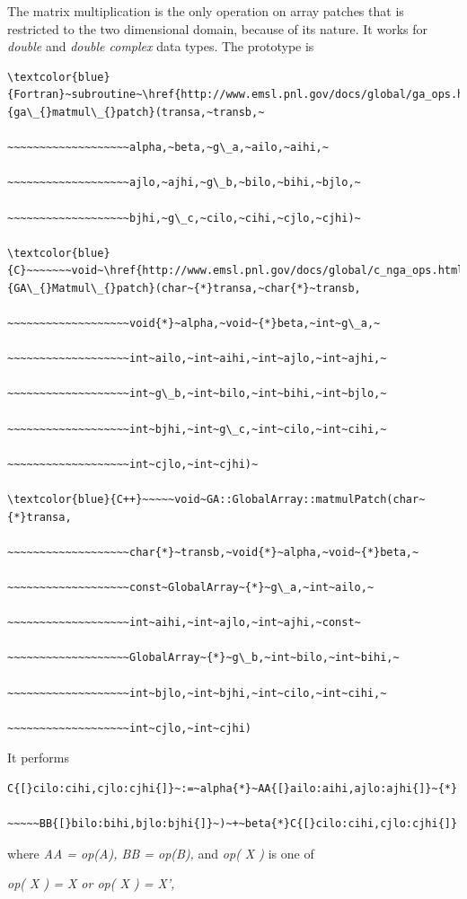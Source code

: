 The matrix multiplication is the only operation on array patches that
is restricted to the two dimensional domain, because of its nature.
It works for\emph{ double} and \emph{double complex} data types. The
prototype is
\begin{verbatim}
\textcolor{blue}{Fortran}~subroutine~\href{http://www.emsl.pnl.gov/docs/global/ga_ops.html\#ga_matmul_patch}{ga\_{}matmul\_{}patch}(transa,~transb,~

~~~~~~~~~~~~~~~~~~~alpha,~beta,~g\_a,~ailo,~aihi,~

~~~~~~~~~~~~~~~~~~~ajlo,~ajhi,~g\_b,~bilo,~bihi,~bjlo,~

~~~~~~~~~~~~~~~~~~~bjhi,~g\_c,~cilo,~cihi,~cjlo,~cjhi)~

\textcolor{blue}{C}~~~~~~~void~\href{http://www.emsl.pnl.gov/docs/global/c_nga_ops.html\#ga_matmul_patch}{GA\_{}Matmul\_{}patch}(char~{*}transa,~char{*}~transb,

~~~~~~~~~~~~~~~~~~~void{*}~alpha,~void~{*}beta,~int~g\_a,~

~~~~~~~~~~~~~~~~~~~int~ailo,~int~aihi,~int~ajlo,~int~ajhi,~

~~~~~~~~~~~~~~~~~~~int~g\_b,~int~bilo,~int~bihi,~int~bjlo,~

~~~~~~~~~~~~~~~~~~~int~bjhi,~int~g\_c,~int~cilo,~int~cihi,~

~~~~~~~~~~~~~~~~~~~int~cjlo,~int~cjhi)~

\textcolor{blue}{C++}~~~~~void~GA::GlobalArray::matmulPatch(char~{*}transa,

~~~~~~~~~~~~~~~~~~~char{*}~transb,~void{*}~alpha,~void~{*}beta,~

~~~~~~~~~~~~~~~~~~~const~GlobalArray~{*}~g\_a,~int~ailo,~

~~~~~~~~~~~~~~~~~~~int~aihi,~int~ajlo,~int~ajhi,~const~

~~~~~~~~~~~~~~~~~~~GlobalArray~{*}~g\_b,~int~bilo,~int~bihi,~

~~~~~~~~~~~~~~~~~~~int~bjlo,~int~bjhi,~int~cilo,~int~cihi,~

~~~~~~~~~~~~~~~~~~~int~cjlo,~int~cjhi)
\end{verbatim}
It performs
\begin{verbatim}
C{[}cilo:cihi,cjlo:cjhi{]}~:=~alpha{*}~AA{[}ailo:aihi,ajlo:ajhi{]}~{*}

~~~~~BB{[}bilo:bihi,bjlo:bjhi{]}~)~+~beta{*}C{[}cilo:cihi,cjlo:cjhi{]}
\end{verbatim}
where \emph{AA = op(A), BB = op(B),} and \emph{op( X )} is one of

\emph{op( X ) = X or op( X ) = X',}

